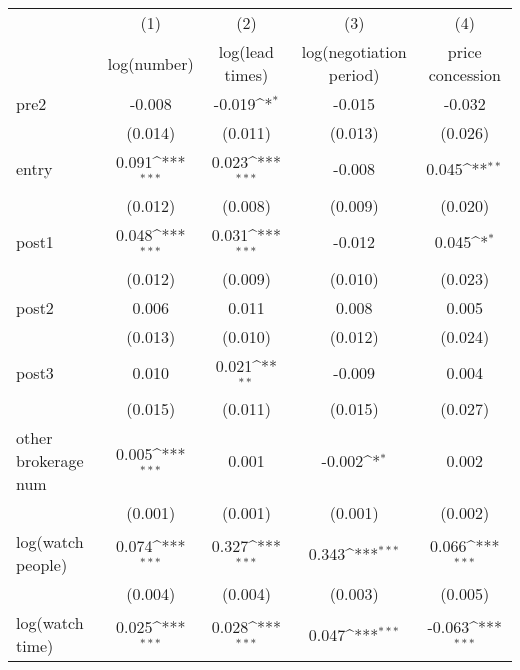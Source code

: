 {
\def\sym#1{\ifmmode^{#1}\else\(^{#1}\)\fi}
\begin{tabular}{l*{4}{c}}
\toprule
            &\multicolumn{1}{c}{(1)}&\multicolumn{1}{c}{(2)}&\multicolumn{1}{c}{(3)}&\multicolumn{1}{c}{(4)}\\
            &\multicolumn{1}{c}{log(number)}&\multicolumn{1}{c}{log(lead times)}&\multicolumn{1}{c}{log(negotiation period)}&\multicolumn{1}{c}{price concession}\\
\midrule
pre2        &      -0.008         &      -0.019\sym{*}  &      -0.015         &      -0.032         \\
            &     (0.014)         &     (0.011)         &     (0.013)         &     (0.026)         \\
\addlinespace
entry       &       0.091\sym{***}&       0.023\sym{***}&      -0.008         &       0.045\sym{**} \\
            &     (0.012)         &     (0.008)         &     (0.009)         &     (0.020)         \\
\addlinespace
post1       &       0.048\sym{***}&       0.031\sym{***}&      -0.012         &       0.045\sym{*}  \\
            &     (0.012)         &     (0.009)         &     (0.010)         &     (0.023)         \\
\addlinespace
post2       &       0.006         &       0.011         &       0.008         &       0.005         \\
            &     (0.013)         &     (0.010)         &     (0.012)         &     (0.024)         \\
\addlinespace
post3       &       0.010         &       0.021\sym{**} &      -0.009         &       0.004         \\
            &     (0.015)         &     (0.011)         &     (0.015)         &     (0.027)         \\
\addlinespace
other brokerage num  &       0.005\sym{***}&       0.001         &      -0.002\sym{*}  &       0.002         \\
            &     (0.001)         &     (0.001)         &     (0.001)         &     (0.002)         \\
\addlinespace
log(watch people)&       0.074\sym{***}&       0.327\sym{***}&       0.343\sym{***}&       0.066\sym{***}\\
            &     (0.004)         &     (0.004)         &     (0.003)         &     (0.005)         \\
\addlinespace
log(watch time)&       0.025\sym{***}&       0.028\sym{***}&       0.047\sym{***}&      -0.063\sym{***}\\

\end{tabular}}
